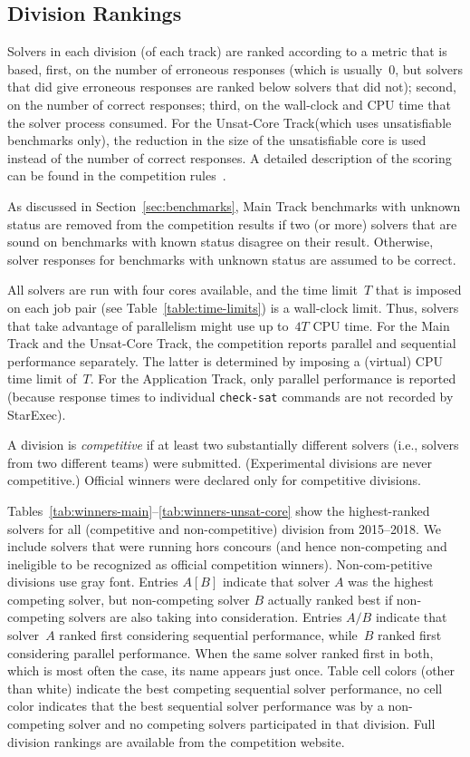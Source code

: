 \documentclass[dvipsnames,table,twoside,11pt]{article}
\newcommand{\maintrack}{Main Track\xspace}
\newcommand{\apptrack}{Application Track\xspace}
\newcommand{\ucoretrack}{Unsat-Core Track\xspace}
\begin{document}
\subsection{Division Rankings}
\label{sec:division-rankings}

Solvers in each division (of each track) are ranked according to a
metric that is based, first, on the number of erroneous responses
(which is usually~0, but solvers that did give erroneous responses are
ranked below solvers that did not); second, on the number of correct
responses; third, on the wall-clock and CPU time that the solver
process consumed.  For the \ucoretrack (which uses unsatisfiable
benchmarks only), the reduction in the size of the unsatisfiable core
is used instead of the number of correct responses.  A detailed
description of the scoring can be found in the competition
rules~\cite{rules18}.

As discussed in Section~\ref{sec:benchmarks}, \maintrack benchmarks
with unknown status are removed from the competition results if two
(or more) solvers that are sound on benchmarks with known status
disagree on their result.  Otherwise, solver responses for benchmarks
with unknown status are assumed to be correct.

All solvers are run with four cores available, and the time limit~$T$
that is imposed on each job pair (see Table~\ref{table:time-limits})
is a wall-clock limit.  Thus, solvers that take advantage of
parallelism might use up to~$4T$ CPU time.  For the \maintrack and the
\ucoretrack, the competition reports parallel and sequential
performance separately.  The latter is determined by imposing a
(virtual) CPU time limit of~$T$.  For the \apptrack, only
parallel performance is reported (because response times to individual
{\tt check-sat} commands are not recorded by StarExec).

A division is \emph{competitive} if
at least two substantially different solvers (i.e., solvers from two
different teams) were submitted.  (Experimental divisions are never
competitive.)  Official winners were declared only for competitive
divisions.

Tables~\ref{tab:winners-main}--\ref{tab:winners-unsat-core} show the
highest-ranked solvers for all (competitive and non-competitive) division from
2015--2018.
We include solvers that were running hors concours (and hence non-competing
and ineligible to be recognized as official competition winners).
Non-com-petitive divisions use gray font.
Entries $A [B]$ indicate that solver $A$ was the highest competing solver,
but non-competing solver $B$ actually ranked best if non-competing solvers
are also taking into consideration.
Entries
$A/B$ indicate that solver~$A$ ranked first considering sequential
performance, while~$B$ ranked first considering parallel performance.
When the same solver ranked first in both, which is most often the
case, its name appears just once.
Table cell colors (other than white) indicate the best competing sequential
solver performance, no cell color indicates that the best sequential solver
performance was by a non-competing solver and no competing solvers participated
in that division.
Full division rankings are available from the competition website.
\end{document}
